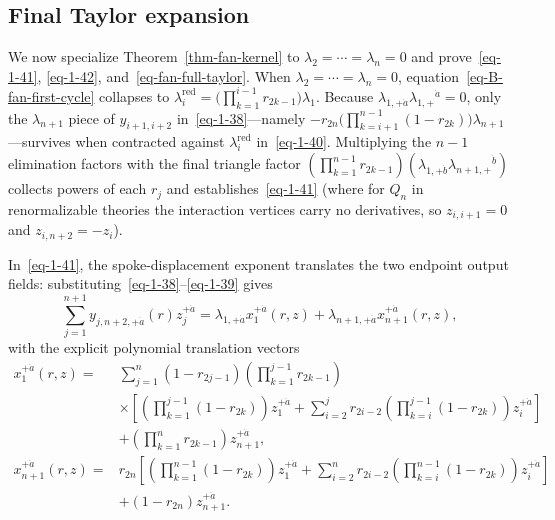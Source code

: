 \documentclass[11pt]{article}
\numberwithin{equation}{section}
\numberwithin{figure}{section}
\numberwithin{table}{section}
\begin{document}
\subsection{Final Taylor expansion}\label{endpoint-sources-and-taylor-expansion}

We now specialize Theorem~\ref{thm-fan-kernel} to $\lambda_2=\cdots=\lambda_n=0$ and prove~\eqref{eq-1-41}, \eqref{eq-1-42}, and~\eqref{eq-fan-full-taylor}. When $\lambda_2=\cdots=\lambda_n=0$, equation~\eqref{eq-B-fan-first-cycle} collapses to $\lambda_i^{\mathrm{red}}=\bigl(\prod_{k=1}^{i-1}r_{2k-1}\bigr)\lambda_1$. Because $\lambda_{1,+\dot a}\lambda_{1,+}{}^{\dot a}=0$, only the $\lambda_{n+1}$ piece of $y_{i+1,i+2}$ in~\eqref{eq-1-38}---namely $-r_{2n}\bigl(\prod_{k=i+1}^{n-1}(1-r_{2k})\bigr)\lambda_{n+1}$---survives when contracted against $\lambda_i^{\mathrm{red}}$ in~\eqref{eq-1-40}. Multiplying the $n-1$ elimination factors with the final triangle factor $(\prod_{k=1}^{n-1}r_{2k-1})(\lambda_{1,+\dot b}\lambda_{n+1,+}{}^{\dot b})$ collects powers of each $r_j$ and establishes~\eqref{eq-1-41} (where for $Q_n$ in renormalizable theories the interaction vertices carry no derivatives, so $z_{i,i+1}=0$ and $z_{i,n+2}=-z_i$).

In~\eqref{eq-1-41}, the spoke-displacement exponent translates the two endpoint output fields: substituting~\eqref{eq-1-38}--\eqref{eq-1-39} gives
\begin{equation}\label{eq-fan-output-translation}
\sum_{j=1}^{n+1}y_{j,n+2,+\dot a}(r)z_j^{+\dot a}
=\lambda_{1,+\dot a}x_1^{+\dot a}(r,z)
+\lambda_{n+1,+\dot a}x_{n+1}^{+\dot a}(r,z),
\end{equation}
with the explicit polynomial translation vectors
\begin{equation}\label{eq-fan-output-points}
\begin{aligned}
x_1^{+\dot a}(r,z)
={}&\sum_{j=1}^{n}(1-r_{2j-1})
\left(\prod_{k=1}^{j-1}r_{2k-1}\right)\\
&\times\left[
\left(\prod_{k=1}^{j-1}(1-r_{2k})\right)z_1^{+\dot a}
+\sum_{i=2}^{j}r_{2i-2}
\left(\prod_{k=i}^{j-1}(1-r_{2k})\right)z_i^{+\dot a}
\right]\\
&+\left(\prod_{k=1}^{n}r_{2k-1}\right)z_{n+1}^{+\dot a},\\[3pt]
x_{n+1}^{+\dot a}(r,z)
={}&r_{2n}\left[
\left(\prod_{k=1}^{n-1}(1-r_{2k})\right)z_1^{+\dot a}
+\sum_{i=2}^{n}r_{2i-2}
\left(\prod_{k=i}^{n-1}(1-r_{2k})\right)z_i^{+\dot a}
\right]\\
&+(1-r_{2n})z_{n+1}^{+\dot a}.
\end{aligned}
\end{equation}
\end{document}
